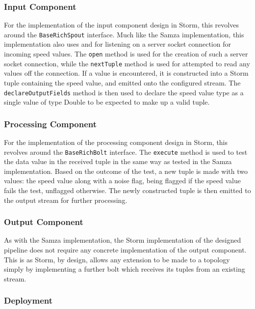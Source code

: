 \subsubsection{Input Component}

For the implementation of the input component design in Storm, this revolves around the \texttt{BaseRichSpout} interface.
Much like the Samza implementation, this implementation also uses  and 
for listening on a server socket connection for incoming speed values. The \texttt{open} method is used for the creation
of such a server socket connection, while the \texttt{nextTuple} method is used for attempted to read any values off the
connection. If a value is encountered, it is constructed into a Storm tuple containing the speed value, and emitted onto
the configured stream. The \texttt{declareOutputFields} method is then used to declare the speed value type as a single
value of type Double to be expected to make up a valid tuple.

\subsubsection{Processing Component}

For the implementation of the processing component design in Storm, this revolves around the \texttt{BaseRichBolt} interface.
The \texttt{execute} method is used to test the data value in the received tuple in the same way as tested in the Samza
implementation. Based on the outcome of the test, a new tuple is made with two values: the speed value along with a
noise flag, being flagged if the speed value fails the test, unflagged otherwise. The newly constructed tuple is then
emitted to the output stream for further processing.

\subsubsection{Output Component}

As with the Samza implementation, the Storm implementation of the designed pipeline does not require any concrete implementation
of the output component. This is as Storm, by design, allows any extension to be made to a topology simply by implementing
a further bolt which receives its tuples from an existing stream.

\subsubsection{Deployment}

